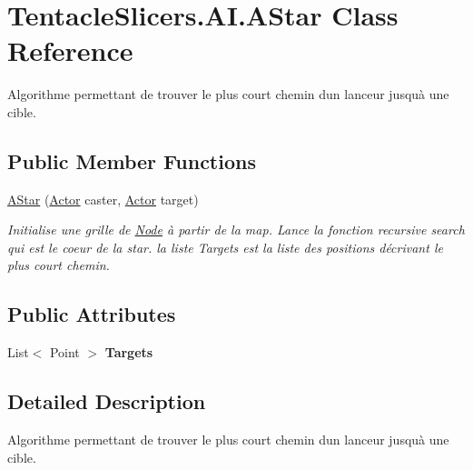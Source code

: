 \hypertarget{class_tentacle_slicers_1_1_a_i_1_1_a_star}{}\section{Tentacle\+Slicers.\+A\+I.\+A\+Star Class Reference}
\label{class_tentacle_slicers_1_1_a_i_1_1_a_star}


Algorithme permettant de trouver le plus court chemin d\textquotesingle{}un lanceur jusqu\textquotesingle{}à une cible.  


\subsection*{Public Member Functions}
\begin{DoxyCompactItemize}
\item 
\hyperlink{class_tentacle_slicers_1_1_a_i_1_1_a_star_a570118ce7fbe28c82c931e7523410bd3}{A\+Star} (\hyperlink{class_tentacle_slicers_1_1actors_1_1_actor}{Actor} caster, \hyperlink{class_tentacle_slicers_1_1actors_1_1_actor}{Actor} target)
\begin{DoxyCompactList}\small\item\em Initialise une grille de \hyperlink{class_tentacle_slicers_1_1_a_i_1_1_node}{Node} à partir de la map. Lance la fonction recursive search qui est le coeur de l\textquotesingle{}a star. la liste Targets est la liste des positions décrivant le plus court chemin. \end{DoxyCompactList}\end{DoxyCompactItemize}
\subsection*{Public Attributes}
\begin{DoxyCompactItemize}
\item 
\mbox{\label{class_tentacle_slicers_1_1_a_i_1_1_a_star_a4ef70bad5255256b113e1eaf77814abb}} 
List$<$ Point $>$ {\bfseries Targets}
\end{DoxyCompactItemize}


\subsection{Detailed Description}
Algorithme permettant de trouver le plus court chemin d\textquotesingle{}un lanceur jusqu\textquotesingle{}à une cible. 



